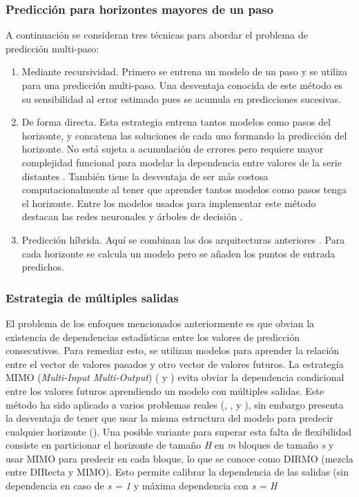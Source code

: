 \documentclass{llncs}
\begin{document}
\subsubsection{Predicción para horizontes mayores de un paso\\}
A continuación se consideran tres técnicas para abordar el problema de predicción multi-paso: 
\begin{enumerate}
\item{Mediante recursividad}. Primero se entrena un modelo de un paso y se utiliza para una predicción multi-paso. Una desventaja conocida de este método es su sensibilidad al error estimado pues se acumula en predicciones sucesivas.
\item{De forma directa}. Esta estrategia entrena tantos modelos como pasos del horizonte, y concatena las soluciones de cada uno formando la predicción del horizonte. No está sujeta a acumulación de errores pero requiere mayor complejidad funcional \cite{Tong1983} para modelar la dependencia entre valores de la serie distantes \cite{Guo1999559}. También tiene la desventaja de ser más costosa computacionalmente al tener que aprender tantos modelos como pasos tenga el horizonte. Entre los modelos usados para implementar este método destacan las redes neuronales \cite{Kline2004226} y árboles de decisión \cite{Tran20099378}.
\item{Predicción híbrida}. Aquí se combinan las dos arquitecturas anteriores \cite{Sorjamaa2006143}. Para cada horizonte se calcula un modelo pero se añaden los puntos de entrada predichos.
\end{enumerate}

\subsubsection{Estrategia de múltiples salidas\\}
El problema de los enfoques mencionados anteriormente es que obvian la existencia de dependencias estadísticas entre los valores de predicción consecutivos. Para remediar esto, se utilizan modelos para aprender la relación entre el vector de valores pasados y otro vector de valores futuros. La estrategía MIMO (\emph{Multi-Input Multi-Output}) (\cite{Bontempi2008145} y \cite{Bontempi2011689}) evita obviar la dependencia condicional entre los valores futuros aprendiendo un modelo con múltiples salidas. Este método ha sido aplicado a varios problemas reales (\cite{Bontempi2008145},  \cite{Bontempi2011689}, \cite{BenTaieb20093054} y \cite{BenTaieb20101950}), sin embargo presenta la desventaja de tener que usar la misma estructura del modelo para predecir cualquier horizonte (\cite{BenTaieb20093054}). Una posible variante para superar esta falta de flexibilidad consiste en particionar el horizonte de tamaño \emph{H} en \emph{m} bloques de tamaño \emph{s} y usar MIMO para predecir en cada bloque, lo que se conoce como DIRMO (mezcla entre DIRecta y MIMO). Esto permite calibrar la dependencia de las salidas (sin dependencia en caso de \emph{s = 1} y máxima dependencia con \emph{s = H}
\end{document}
